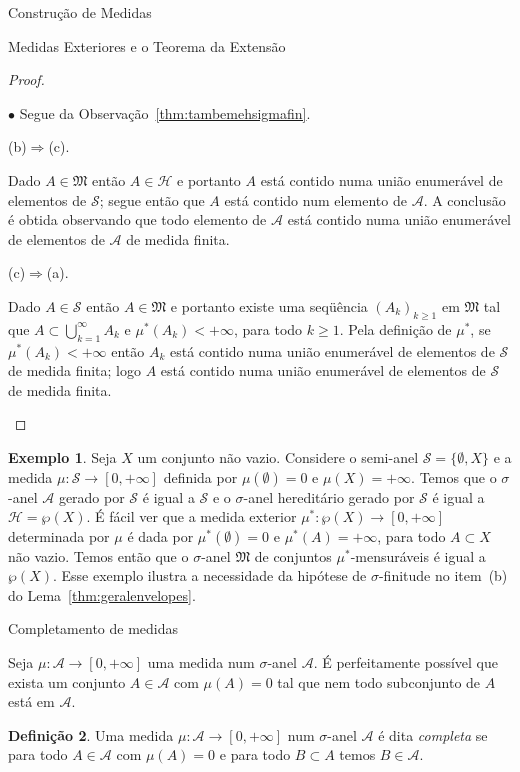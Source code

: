 \documentclass[oneside,final,11pt]{amsbook}
\newcounter{contador}
\newenvironment{bulletindent}{\setcounter{contador}{0}
\begin{list} {$\bullet$}
{\usecounter{contador}
\setlength{\leftmargin}{10pt}
\setlength{\rightmargin}{10pt}
\setlength{\labelsep}{5pt}
\setlength{\itemsep}{10pt}
\setlength{\topsep}{10pt}}}
{\end{list}}
\theoremstyle{remark}\newtheorem{exercise}{Exercício}[chapter]
\theoremstyle{remark}\newtheorem{*exercise}[exercise]{\hbox to 0pt{\hskip 0pt minus 1fil*}Exercício}
\theoremstyle{definition}\newtheorem{exdefin}{Definição}[chapter]
\theoremstyle{plain}\newtheorem{teo}{Teorema}[section]
\theoremstyle{plain}\newtheorem{lem}[teo]{Lema}
\theoremstyle{plain}\newtheorem{prop}[teo]{Proposição}
\theoremstyle{plain}\newtheorem{cor}[teo]{Corolário}
\theoremstyle{definition}\newtheorem{defin}[teo]{Definição}
\theoremstyle{remark}\newtheorem{rem}[teo]{Observação}
\theoremstyle{definition}\newtheorem{notation}[teo]{Notação}
\theoremstyle{definition}\newtheorem{convention}[teo]{Convenção}
\theoremstyle{definition}\newtheorem{example}[teo]{Exemplo}
\numberwithin{section}{chapter}
\numberwithin{equation}{section}
\begin{document}
\begin{chapter}{Construção de Medidas}
\begin{section}{Medidas Exteriores e o Teorema da Extensão}
\begin{proof}
\begin{bulletindent}
Segue da Observação~\ref{thm:tambemehsigmafin}.

\item (b)$\Rightarrow$(c).

Dado $A\in\mathfrak M$ então $A\in\mathcal H$ e portanto $A$ está contido numa união enumerável
de elementos de $\mathcal S$; segue então que $A$ está contido num elemento de $\mathcal A$.
A conclusão é obtida observando que todo elemento de $\mathcal A$ está contido numa união
enumerável de elementos de $\mathcal A$ de medida finita.

\item (c)$\Rightarrow$(a).

Dado $A\in\mathcal S$ então $A\in\mathfrak M$ e portanto existe uma seqüência $(A_k)_{k\ge1}$ em $\mathfrak M$
tal que $A\subset\bigcup_{k=1}^\infty A_k$ e $\mu^*(A_k)<+\infty$, para todo $k\ge1$.
Pela definição de $\mu^*$, se $\mu^*(A_k)<+\infty$ então $A_k$ está contido numa união
enumerável de elementos de $\mathcal S$ de medida finita; logo $A$ está contido numa união
enumerável de elementos de $\mathcal S$ de medida finita.\qedhere
\end{bulletindent}
\end{proof}

\begin{example}
Seja $X$ um conjunto não vazio. Considere o semi-anel $\mathcal S=\{\emptyset,X\}$ e
a medida $\mu:\mathcal S\to[0,+\infty]$ definida por $\mu(\emptyset)=0$ e $\mu(X)=+\infty$.
Temos que o $\sigma$-anel $\mathcal A$ gerado por $\mathcal S$ é igual a $\mathcal S$ e o
$\sigma$-anel hereditário gerado por $\mathcal S$ é igual a $\mathcal H=\wp(X)$.
É fácil ver que a medida exterior
$\mu^*:\wp(X)\to[0,+\infty]$ determinada por $\mu$
é dada por $\mu^*(\emptyset)=0$ e $\mu^*(A)=+\infty$, para todo $A\subset X$ não vazio.
Temos então que o $\sigma$-anel $\mathfrak M$ de conjuntos $\mu^*$-mensuráveis
é igual a $\wp(X)$. Esse exemplo ilustra a necessidade da hipótese de $\sigma$-finitude
no item~(b) do Lema~\ref{thm:geralenvelopes}.
\end{example}

\begin{subsection}{Completamento de medidas}

Seja $\mu:\mathcal A\to[0,+\infty]$ uma medida num $\sigma$-anel $\mathcal A$. É perfeitamente
possível que exista um conjunto $A\in\mathcal A$ com $\mu(A)=0$ tal que nem todo subconjunto
de $A$ está em $\mathcal A$.

\begin{defin}
Uma medida $\mu:\mathcal A\to[0,+\infty]$ num $\sigma$-anel $\mathcal A$ é dita
{\em completa\/} se para todo
$A\in\mathcal A$ com $\mu(A)=0$ e para todo $B\subset A$ temos $B\in\mathcal A$.
\end{defin}


\end{subsection}
\end{section}
\end{chapter}
\end{document}
